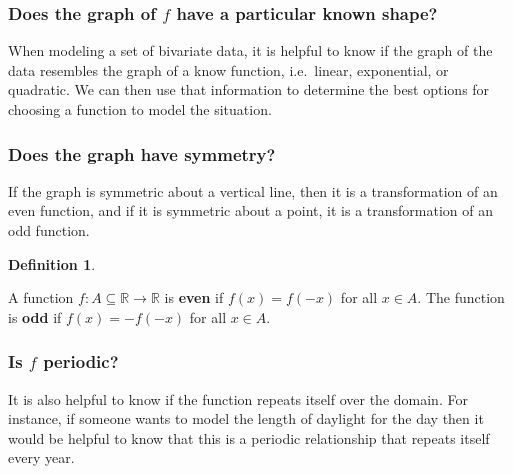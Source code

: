 \documentclass[
]{book}
\theoremstyle{definition}
\newtheorem{definition}{Definition}[chapter]
\theoremstyle{definition}
\theoremstyle{definition}
\theoremstyle{definition}
\theoremstyle{remark}
\begin{document}
\hypertarget{does-the-graph-of-f-have-a-particular-known-shape}{%
\subsubsection*{\texorpdfstring{Does the graph of \(f\) have a particular known shape?}{Does the graph of f have a particular known shape?}}\label{does-the-graph-of-f-have-a-particular-known-shape}}

When modeling a set of bivariate data, it is helpful to know if the graph of the data resembles the graph of a know function, i.e.~linear, exponential, or quadratic. We can then use that information to determine the best options for choosing a function to model the situation.

\hypertarget{does-the-graph-have-symmetry}{%
\subsubsection*{Does the graph have symmetry?}\label{does-the-graph-have-symmetry}}

If the graph is symmetric about a vertical line, then it is a transformation of an even function, and if it is symmetric about a point, it is a transformation of an odd function.

\begin{definition}
\protect\hypertarget{def:unlabeled-div-131}{}\label{def:unlabeled-div-131}

A function \(f:A\subseteq \mathbb{R}\rightarrow \mathbb{R}\) is \textbf{even} if \(f(x)=f(-x)\) for all \(x\in A\). The function is \textbf{odd} if \(f(x)=-f(-x)\) for all \(x\in A\).

\end{definition}

\hypertarget{is-f-periodic}{%
\subsubsection*{\texorpdfstring{Is \(f\) periodic?}{Is f periodic?}}\label{is-f-periodic}}

It is also helpful to know if the function repeats itself over the domain. For instance, if someone wants to model the length of daylight for the day then it would be helpful to know that this is a periodic relationship that repeats itself every year.
\end{document}
